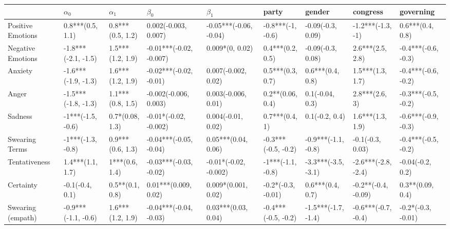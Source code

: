 \begin{tabular}{lllllllll}
\toprule
{} &           $\alpha_0$ &         $\alpha_1$ &                $\beta_0$ &               $\beta_1$ &                party &               gender &             congress &            governing \\
\midrule
Positive Emotions     &     0.8***(0.5, 1.1) &   0.8***(0.5, 1.2) &     0.002(-0.003, 0.007) &  -0.05***(-0.06, -0.04) &    -0.8***(-1, -0.6) &    -0.09(-0.3, 0.09) &    -1.2***(-1.3, -1) &     0.6***(0.4, 0.8) \\
Negative Emotions     &  -1.8***(-2.1, -1.5) &   1.5***(1.2, 1.9) &  -0.01***(-0.02, -0.007) &         0.009*(0, 0.02) &     0.4***(0.2, 0.5) &    -0.09(-0.3, 0.08) &     2.6***(2.5, 2.8) &  -0.4***(-0.6, -0.3) \\
Anxiety               &  -1.6***(-1.9, -1.3) &   1.6***(1.2, 1.9) &   -0.02***(-0.02, -0.01) &     0.007(-0.002, 0.02) &     0.5***(0.3, 0.7) &     0.6***(0.4, 0.8) &     1.5***(1.3, 1.7) &  -0.4***(-0.6, -0.2) \\
Anger                 &  -1.5***(-1.8, -1.3) &   1.1***(0.8, 1.5) &    -0.002(-0.006, 0.003) &     0.003(-0.006, 0.01) &     0.2**(0.06, 0.4) &      0.1(-0.04, 0.3) &       2.8***(2.6, 3) &  -0.3***(-0.5, -0.2) \\
Sadness               &    -1***(-1.5, -0.6) &    0.7*(0.08, 1.3) &    -0.01*(-0.02, -0.002) &      0.004(-0.01, 0.02) &       0.7***(0.4, 1) &       0.1(-0.2, 0.4) &     1.6***(1.3, 1.9) &  -0.6***(-0.9, -0.3) \\
Swearing Terms        &    -1***(-1.3, -0.8) &   0.9***(0.6, 1.3) &   -0.04***(-0.05, -0.04) &     0.05***(0.04, 0.06) &  -0.3***(-0.5, -0.2) &  -0.9***(-1.1, -0.8) &     -0.1(-0.3, 0.03) &  -0.4***(-0.5, -0.2) \\
Tentativeness         &     1.4***(1.1, 1.7) &     1***(0.6, 1.4) &   -0.03***(-0.03, -0.02) &   -0.01*(-0.02, -0.002) &    -1***(-1.1, -0.8) &  -3.3***(-3.5, -3.1) &  -2.6***(-2.8, -2.4) &     -0.04(-0.2, 0.2) \\
Certainty             &      -0.1(-0.4, 0.1) &    0.5**(0.1, 0.8) &     0.01***(0.009, 0.02) &     0.009*(0.001, 0.02) &   -0.2*(-0.3, -0.01) &     0.6***(0.4, 0.7) &  -0.2**(-0.4, -0.09) &     0.3**(0.09, 0.4) \\
Swearing (empath)     &  -0.9***(-1.1, -0.6) &   1.6***(1.2, 1.9) &   -0.04***(-0.04, -0.03) &     0.03***(0.03, 0.04) &  -0.4***(-0.5, -0.2) &  -1.5***(-1.7, -1.4) &  -0.6***(-0.7, -0.4) &   -0.2*(-0.3, -0.01) \\

\end{tabular}
